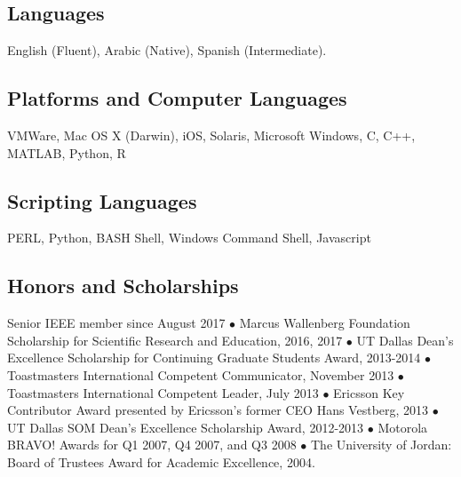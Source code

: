 \documentclass{article}
\begin{document}
\subsection*{\sc Languages}
English (Fluent), Arabic (Native), Spanish (Intermediate).
\vspace*{-0.1in}
\subsection*{\sc Platforms and Computer Languages}
VMWare, Mac OS X (Darwin), iOS, Solaris, Microsoft Windows, C, C++, MATLAB, Python, R
\vspace*{-0.1in}
\subsection*{\sc Scripting Languages}
PERL, Python, BASH Shell, Windows Command Shell, Javascript
\vspace*{-0.1in}
\subsection*{\sc Honors and Scholarships}
Senior IEEE member since August 2017 $\bullet$ Marcus Wallenberg Foundation Scholarship for Scientific Research and Education, 2016, 2017 $\bullet$ UT Dallas Dean's Excellence Scholarship for Continuing Graduate Students Award, 2013-2014 $\bullet$ Toastmasters International Competent Communicator, November 2013 $\bullet$ Toastmasters International Competent Leader, July 2013 $\bullet$ Ericsson Key Contributor Award presented by Ericsson's former CEO Hans Vestberg, 2013 $\bullet$ UT Dallas SOM Dean's Excellence Scholarship Award, 2012-2013 $\bullet$ Motorola BRAVO! Awards for Q1 2007, Q4 2007, and Q3 2008 $\bullet$ The University of Jordan: Board of Trustees Award for Academic Excellence, 2004.
\end{document}
